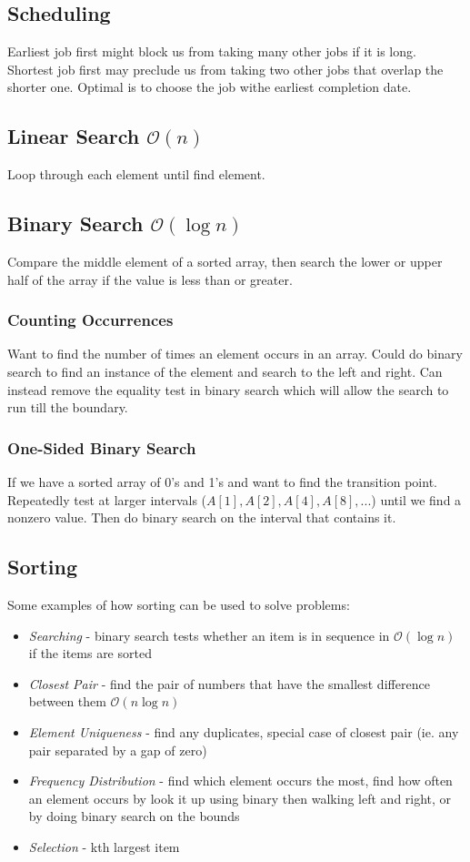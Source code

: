 \documentclass[10pt]{article}
\theoremstyle{definition}
\begin{document}
\subsection{Scheduling}
Earliest job first might block us from taking many other jobs if it is long. Shortest job first may preclude us from taking two other jobs that overlap the shorter one. Optimal is to choose the job withe earliest completion date.

\subsection{Linear Search $\mathcal{O}(n)$}
Loop through each element until find element.

\subsection{Binary Search $\mathcal{O}(\log n)$}
Compare the middle element of a sorted array, then search the lower or upper half of the array if the value is less than or greater.

\subsubsection{Counting Occurrences}
Want to find the number of times an element occurs in an array. Could do binary search to find an instance of the element and search to the left and right. Can instead remove the equality test in binary search which will allow the search to run till the boundary.

\subsubsection{One-Sided Binary Search}
If we have a sorted array of 0's and 1's and want to find the transition point. Repeatedly test at larger intervals ($A[1], A[2], A[4], A[8],...$) until we find a nonzero value. Then do binary search on the interval that contains it.

\subsection{Sorting} 
Some examples of how sorting can be used to solve problems:
\begin{itemize}
    \item \textit{Searching} - binary search tests whether an item is in sequence in $\mathcal{O}(\log n)$ if the items are sorted
    \item \textit{Closest Pair} - find the pair of numbers that have the smallest difference between them $\mathcal{O}(n\log n)$
    \item \textit{Element Uniqueness} - find any duplicates, special case of closest pair (ie. any pair separated by a gap of zero)
    \item \textit{Frequency Distribution} - find which element occurs the most, find how often an element occurs by look it up using binary then walking left and right, or by doing binary search on the bounds
    \item \textit{Selection} - kth largest item
\end{itemize}
\end{document}

